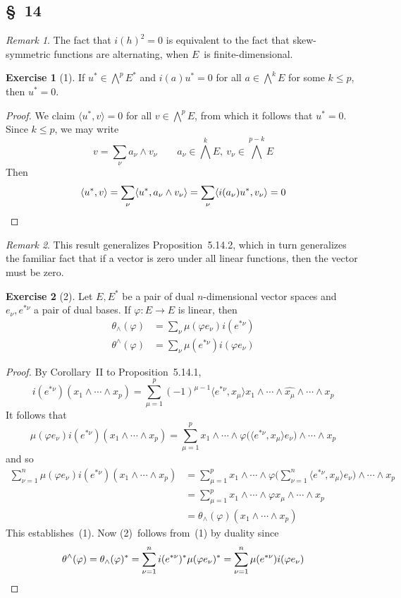 \documentclass[letterpaper,12pt]{article}
\newcommand{\eprod}{\wedge}
\newcommand{\bigeprod}{\bigwedge}
\newcommand{\medeprod}{{\textstyle\bigeprod}}
\newcommand{\delete}{\widehat}
\newcommand{\sprod}[2]{\langle#1,#2\rangle}
\newcommand{\multi}[4]{#2_{#3}#1\cdots#1#2_{#4}}
\newcommand{\eprods}[3]{\multi{\eprod}{#1}{#2}{#3}}
\theoremstyle{definition}
\newtheorem*{exer}{Exercise}
\theoremstyle{remark}
\newtheorem*{rmk}{Remark}
\begin{document}
\subsection*{\S~14}
\begin{rmk}
The fact that \(i(h)^2=0\) is equivalent to the fact that skew-symmetric functions are alternating, when \(E\)~is finite-dimensional.
\end{rmk}

\begin{exer}[1]
If \(u^*\in\medeprod^p E^*\) and \(i(a)u^*=0\) for all \(a\in\medeprod^k E\) for some \(k\le p\), then \(u^*=0\).
\end{exer}
\begin{proof}
We claim \(\sprod{u^*}{v}=0\) for all \(v\in\medeprod^p E\), from which it follows that \(u^*=0\). Since \(k\le p\), we may write
\[v=\sum_{\nu}a_{\nu}\eprod v_{\nu}\qquad a_{\nu}\in\medeprod^k E,\ v_{\nu}\in\medeprod^{p-k}E\]
Then
\[\sprod{u^*}{v}=\sum_{\nu}\sprod{u^*}{a_{\nu}\eprod v_{\nu}}=\sum_{\nu}\sprod{i(a_{\nu})u^*}{v_{\nu}}=0\qedhere\]
\end{proof}
\begin{rmk}
This result generalizes Proposition~5.14.2, which in turn generalizes the familiar fact that if a vector is zero under all linear functions, then the vector must be zero.
\end{rmk}

\begin{exer}[2]
Let \(E,E^*\) be a pair of dual \(n\)-dimensional vector spaces and \(e_{\nu},e^{*\nu}\) a pair of dual bases. If \(\varphi:E\to E\) is linear, then
\begin{align*}
\theta_{\eprod}(\varphi)&=\sum_{\nu}\mu(\varphi e_{\nu})i(e^{*\nu})\tag{1}\\
\theta^{\eprod}(\varphi)&=\sum_{\nu}\mu(e^{*\nu})i(\varphi e_{\nu})\tag{2}
\end{align*}
\end{exer}
\begin{proof}
By Corollary~II to Proposition~5.14.1,
\[i(e^{*\nu})(\eprods{x}{1}{p})=\sum_{\mu=1}^p(-1)^{\mu-1}\sprod{e^{*\nu}}{x_{\mu}}x_1\eprod\cdots\eprod\delete{x_{\mu}}\eprod\cdots\eprod x_p\]
It follows that
\[\mu(\varphi e_{\nu})i(e^{*\nu})(\eprods{x}{1}{p})=\sum_{\mu=1}^p x_1\eprod\cdots\eprod\varphi\bigl(\sprod{e^{*\nu}}{x_{\mu}}e_{\nu}\bigr)\eprod\cdots\eprod x_p\]
and so
\begin{align*}
\sum_{\nu=1}^n\mu(\varphi e_{\nu})i(e^{*\nu})(\eprods{x}{1}{p})&=\sum_{\mu=1}^p x_1\eprod\cdots\eprod\varphi\bigl(\sum_{\nu=1}^n\sprod{e^{*\nu}}{x_{\mu}}e_{\nu}\bigr)\eprod\cdots\eprod x_p\\
	&=\sum_{\mu=1}^p x_1\eprod\cdots\eprod\varphi x_{\mu}\eprod\cdots\eprod x_p\\
	&=\theta_{\eprod}(\varphi)(\eprods{x}{1}{p})
\end{align*}
This establishes~(1). Now (2)~follows from~(1) by duality since
\[\theta^{\eprod}(\varphi)=\theta_{\eprod}(\varphi)^*=\sum_{\nu=1}^n i(e^{*\nu})^*\mu(\varphi e_{\nu})^*=\sum_{\nu=1}^n\mu(e^{*\nu})i(\varphi e_{\nu})\qedhere\]
\end{proof}
\end{document}
